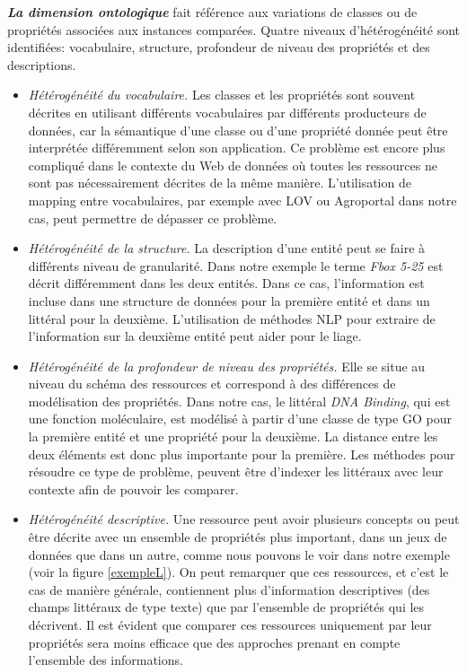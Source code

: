\textbf{\textit{La dimension ontologique}} fait référence aux variations de classes ou de propriétés associées aux instances comparées. Quatre niveaux d'hétérogénéité sont identifiées: vocabulaire, structure, profondeur de niveau des propriétés et des descriptions.\\
\begin{itemize}
\item \textit{Hétérogénéité du vocabulaire.} Les classes et les propriétés sont souvent décrites en utilisant différents vocabulaires par différents producteurs de données, car la sémantique d'une classe ou d'une propriété donnée peut être interprétée différemment selon son application. Ce problème est encore plus compliqué dans le contexte du Web de données où toutes les ressources ne sont pas nécessairement décrites de la même manière. L'utilisation de mapping entre vocabulaires, par exemple avec LOV ou Agroportal dans notre cas, peut permettre de dépasser ce problème.\\

\item \textit{Hétérogénéité de la structure.} La description d'une entité peut se faire à différents niveau de granularité. Dans notre exemple le terme \textit{Fbox 5-25} est décrit différemment dans les deux entités. Dans ce cas, l'information est incluse dans une structure de données pour la première entité et dans un littéral pour la deuxième. L'utilisation de méthodes NLP pour extraire de l'information sur la deuxième entité peut aider pour le liage.\\

\item \textit{Hétérogénéité de la profondeur de niveau des propriétés.} Elle se situe au niveau du schéma des ressources et correspond à des différences de modélisation des propriétés. Dans notre cas, le littéral \textit{DNA Binding}, qui est une fonction moléculaire, est modélisé à partir d'une classe de type GO pour la première entité et une propriété pour la deuxième. La distance entre les deux éléments est donc plus importante pour la première. Les méthodes pour résoudre ce type de problème, peuvent être d'indexer les littéraux avec leur contexte afin de pouvoir les comparer.\\

\item \textit{Hétérogénéité descriptive.} Une ressource peut avoir plusieurs concepts ou peut être décrite avec un ensemble de propriétés plus important, dans un jeux de données que dans un autre, comme nous pouvons le voir dans notre exemple (voir la figure \ref{exempleL}). On peut remarquer que ces ressources, et c'est le cas de manière générale, contiennent plus d'information descriptives (des champs littéraux de type texte) que par l'ensemble de propriétés qui les décrivent. Il est évident que comparer ces ressources uniquement par leur propriétés sera moins efficace que des approches prenant en compte l'ensemble des informations. \\

\end{itemize}

